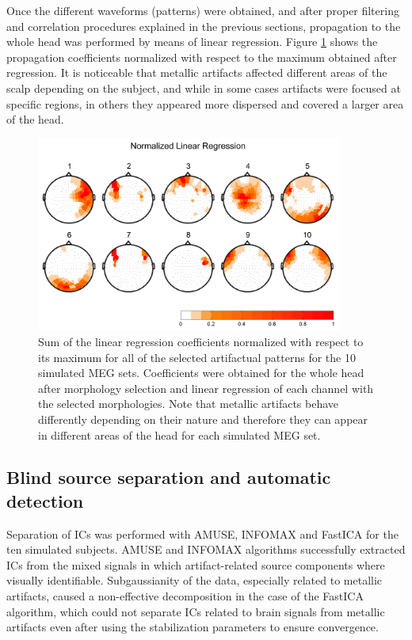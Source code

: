 Once the different waveforms (patterns) were obtained, and after proper filtering and correlation procedures explained in the previous sections, propagation to the whole head was performed by means of linear regression. Figure \ref{fig:1-3} shows the propagation coefficients normalized with respect to the maximum obtained after regression. It is noticeable that metallic artifacts affected different areas of the scalp depending on the subject, and while in some cases artifacts were focused at specific regions, in others they appeared more dispersed and covered a larger area of the head.

\begin{figure}[ht]
\centering
\includegraphics[width=0.9\textwidth]{Images/fig1-3.png}
\caption{Sum of the linear regression coefficients normalized with respect to its maximum for all of the selected artifactual patterns for the 10 simulated MEG sets. Coefficients were obtained for the whole head after morphology selection and linear regression of each channel with the selected morphologies. Note that metallic artifacts behave differently depending on their nature and therefore they can appear in different areas of the head for each simulated MEG set.}
\label{fig:1-3}
\end{figure}      

\subsection{Blind source separation and automatic detection}

Separation of ICs was performed with AMUSE, INFOMAX and FastICA for the ten simulated subjects. AMUSE and INFOMAX algorithms successfully extracted ICs from the mixed signals in which artifact-related source components where visually identifiable. Subgaussianity of the data, especially related to metallic artifacts, caused a non-effective decomposition in the case of the FastICA algorithm, which could not separate ICs related to brain signals from metallic artifacts even after using the stabilization parameters to ensure convergence.

